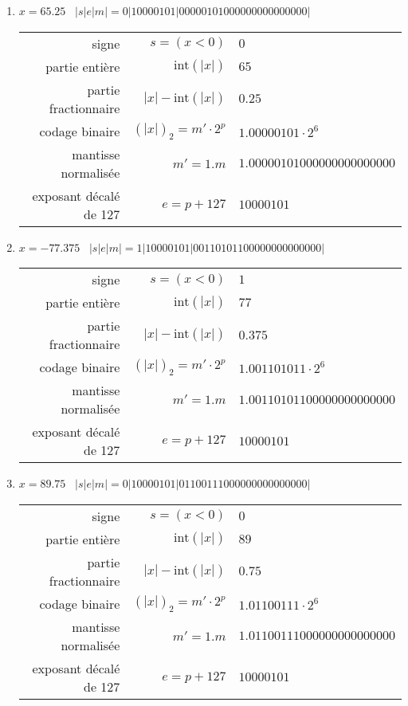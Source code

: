 \documentclass[11pt,a4paper]{article}
\begin{document}
\begin{enumerate}
\item $x = 65.25$ \dotfill\ {$|s|e|m| = 0|10000101|00000101000000000000000|$}
{\footnotesize
\begin{tabular}{r@{ : }r@{ $=$ }l}
signe 					& $s = (x < 0)$ 			& $0$ \\
partie entière 			& $\mbox{int}(|x|)$ 		& $65$ \\
partie fractionnaire 	& $|x| - \mbox{int}(|x|)$ 	& $0.25$ \\
codage binaire 			& $(|x|)_2 = m'\cdot 2^p$   & $1.00000101 \cdot 2^{6}$ \\
mantisse normalisée 	& $m' = 1.m$ 				& $1.00000101000000000000000$ \\
exposant décalé de 127 	& $e = p+127$ 				& $10000101$ \\[2mm]
\end{tabular}
}

\item $x = -77.375$ \dotfill\ {$|s|e|m| = 1|10000101|00110101100000000000000|$}
{\footnotesize
\begin{tabular}{r@{ : }r@{ $=$ }l}
signe 					& $s = (x < 0)$ 			& $1$ \\
partie entière 			& $\mbox{int}(|x|)$ 		& $77$ \\
partie fractionnaire 	& $|x| - \mbox{int}(|x|)$ 	& $0.375$ \\
codage binaire 			& $(|x|)_2 = m'\cdot 2^p$   & $1.001101011 \cdot 2^{6}$ \\
mantisse normalisée 	& $m' = 1.m$ 				& $1.00110101100000000000000$ \\
exposant décalé de 127 	& $e = p+127$ 				& $10000101$ \\[2mm]
\end{tabular}
}

\item $x = 89.75$ \dotfill\ {$|s|e|m| = 0|10000101|01100111000000000000000|$}
{\footnotesize
\begin{tabular}{r@{ : }r@{ $=$ }l}
signe 					& $s = (x < 0)$ 			& $0$ \\
partie entière 			& $\mbox{int}(|x|)$ 		& $89$ \\
partie fractionnaire 	& $|x| - \mbox{int}(|x|)$ 	& $0.75$ \\
codage binaire 			& $(|x|)_2 = m'\cdot 2^p$   & $1.01100111 \cdot 2^{6}$ \\
mantisse normalisée 	& $m' = 1.m$ 				& $1.01100111000000000000000$ \\
exposant décalé de 127 	& $e = p+127$ 				& $10000101$ \\[2mm]
\end{tabular}
}


\end{enumerate}
\end{document}
